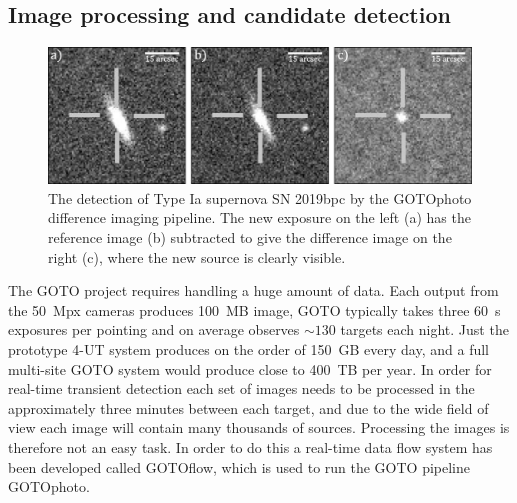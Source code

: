 \begin{colsection}
\begin{colsection}
\clearpage

\end{colsection}


\subsection{Image processing and candidate detection}
\label{sec:gotophoto}
\begin{colsection}

\begin{figure}[t]
    \begin{center}
        \includegraphics[width=\linewidth]{images/diffimg.pdf}
    \end{center}
    \caption[The detection of SN 2019bpc through difference imaging]{
        The detection of Type Ia supernova SN 2019bpc by the GOTOphoto difference imaging pipeline. The new exposure on the left (a) has the reference image (b) subtracted to give the difference image on the right (c), where the new source is clearly visible.
    }\label{fig:diffimg}
\end{figure}

The GOTO project requires handling a huge amount of data. Each output from the 50~Mpx cameras produces 100~MB image, GOTO typically takes three \SI{60}{\second} exposures per pointing and on average observes $\sim130$ targets each night. Just the prototype 4-UT system produces on the order of 150~GB every day, and a full multi-site GOTO system would produce close to 400~TB per year. In order for real-time transient detection each set of images needs to be processed in the approximately three minutes between each target, and due to the wide field of view each image will contain many thousands of sources. Processing the images is therefore not an easy task. In order to do this a real-time data flow system has been developed called GOTOflow, which is used to run the GOTO pipeline GOTOphoto.


\end{colsection}
\end{colsection}
